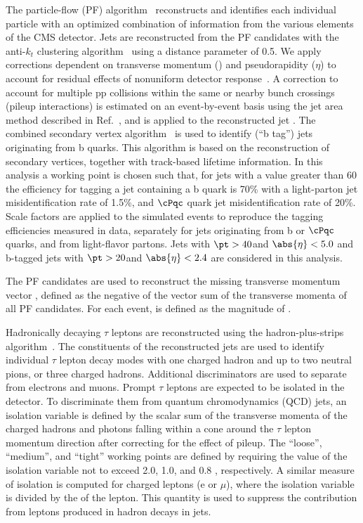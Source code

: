 The particle-flow (PF) algorithm~\cite{CMS-PAS-PFT-09-001,CMS-PAS-PFT-10-001} reconstructs and identifies each
individual particle with an optimized combination of information from the various elements of the CMS detector.
Jets are reconstructed from the PF candidates with the anti-$k_t$ clustering
algorithm~\cite{Cacciari:2008gp} using a distance parameter of 0.5.
We apply corrections dependent on transverse momentum (\pt) and pseudorapidity ($\eta$)
to account for residual effects of nonuniform detector response~\cite{Chatrchyan:2011ds}.
A correction to account for multiple pp collisions within the same or nearby
bunch crossings (pileup interactions) is estimated on an event-by-event basis using the
jet area method described in Ref.~\cite{Cacciari:2007fd}, and is
applied to the reconstructed jet \pt.
The combined secondary vertex algorithm~\cite{Chatrchyan:2012jua} is used to identify (``b tag'') jets
originating from b quarks.  This algorithm  is based on the reconstruction of secondary vertices, together with track-based lifetime information.
In this analysis a working point is chosen such that, for jets with a \pt value greater than 60\GeV
the efficiency for tagging a jet containing a b quark is 70\% with a light-parton jet misidentification rate of 1.5\%,
and $\cPqc$ quark jet misidentification rate of 20\%.
Scale factors are applied to the simulated events to reproduce the tagging efficiencies measured in data,
separately for jets originating from b or $\cPqc$ quarks, and from light-flavor partons.
Jets with  $\pt > 40$\GeV and $\abs{\eta} < 5.0$ and b-tagged jets with $\pt > 20$\GeV and $\abs{\eta} < 2.4$ are considered in this analysis.

The PF candidates are used to reconstruct the missing transverse momentum  vector \ptvecmiss,
defined as the negative of the vector sum of the transverse momenta of all PF candidates.
For each event, \MPT is defined as the magnitude of \ptvecmiss.

Hadronically decaying $\tau$ leptons are reconstructed using the hadron-plus-strips algorithm~\cite{Khachatryan:2015dfa}.
The constituents of the reconstructed jets are used to identify individual $\tau$ lepton decay modes with one charged
hadron and up to two neutral pions, or three charged hadrons.
Additional discriminators are used to separate \Tau from electrons and muons.
Prompt $\tau$ leptons are expected to be isolated in the detector.
To discriminate them from quantum chromodynamics (QCD) jets,
an isolation variable \cite{Khachatryan:2014wca} is defined by the scalar sum of the transverse momenta of the charged hadrons 
and photons falling within 
a cone around the $\tau$ lepton momentum direction after correcting for the effect of
pileup. The ``loose'', ``medium'', and ``tight'' working points are defined
by requiring the value of the isolation variable not to exceed 2.0, 1.0,
and 0.8 \GeV, respectively.
A similar measure of isolation is computed for charged leptons (e or $\mu$),
where the isolation variable is divided by the \pt of the lepton. This quantity is
used to suppress the contribution from leptons produced in hadron decays in jets.

